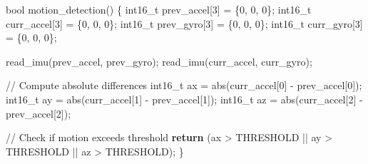 \documentclass[
  9pt,
  letterpaper,
  abstract,
  titlepage]{scrbook}
\newenvironment{Shaded}{\begin{snugshade}}{\end{snugshade}}
\newcommand{\CommentTok}[1]{\textcolor[rgb]{0.37,0.37,0.37}{#1}}
\newcommand{\ControlFlowTok}[1]{\textcolor[rgb]{0.00,0.23,0.31}{\textbf{#1}}}
\newcommand{\DataTypeTok}[1]{\textcolor[rgb]{0.68,0.00,0.00}{#1}}
\newcommand{\DecValTok}[1]{\textcolor[rgb]{0.68,0.00,0.00}{#1}}
\newcommand{\NormalTok}[1]{\textcolor[rgb]{0.00,0.23,0.31}{#1}}
\newcommand{\OperatorTok}[1]{\textcolor[rgb]{0.37,0.37,0.37}{#1}}
\begin{document}
\begin{Shaded}
\begin{Highlighting}[]
\DataTypeTok{bool}\NormalTok{ motion\_detection}\OperatorTok{()} \OperatorTok{\{}
  \DataTypeTok{int16\_t}\NormalTok{ prev\_accel}\OperatorTok{[}\DecValTok{3}\OperatorTok{]} \OperatorTok{=} \OperatorTok{\{}\DecValTok{0}\OperatorTok{,} \DecValTok{0}\OperatorTok{,} \DecValTok{0}\OperatorTok{\};}
  \DataTypeTok{int16\_t}\NormalTok{ curr\_accel}\OperatorTok{[}\DecValTok{3}\OperatorTok{]} \OperatorTok{=} \OperatorTok{\{}\DecValTok{0}\OperatorTok{,} \DecValTok{0}\OperatorTok{,} \DecValTok{0}\OperatorTok{\};}
  \DataTypeTok{int16\_t}\NormalTok{ prev\_gyro}\OperatorTok{[}\DecValTok{3}\OperatorTok{]} \OperatorTok{=} \OperatorTok{\{}\DecValTok{0}\OperatorTok{,} \DecValTok{0}\OperatorTok{,} \DecValTok{0}\OperatorTok{\};}
  \DataTypeTok{int16\_t}\NormalTok{ curr\_gyro}\OperatorTok{[}\DecValTok{3}\OperatorTok{]} \OperatorTok{=} \OperatorTok{\{}\DecValTok{0}\OperatorTok{,} \DecValTok{0}\OperatorTok{,} \DecValTok{0}\OperatorTok{\};}

\NormalTok{  read\_imu}\OperatorTok{(}\NormalTok{prev\_accel}\OperatorTok{,}\NormalTok{ prev\_gyro}\OperatorTok{);}
\NormalTok{  read\_imu}\OperatorTok{(}\NormalTok{curr\_accel}\OperatorTok{,}\NormalTok{ curr\_gyro}\OperatorTok{);}

  \CommentTok{// Compute absolute differences}
  \DataTypeTok{int16\_t}\NormalTok{ ax }\OperatorTok{=}\NormalTok{ abs}\OperatorTok{(}\NormalTok{curr\_accel}\OperatorTok{[}\DecValTok{0}\OperatorTok{]} \OperatorTok{{-}}\NormalTok{ prev\_accel}\OperatorTok{[}\DecValTok{0}\OperatorTok{]);}
  \DataTypeTok{int16\_t}\NormalTok{ ay }\OperatorTok{=}\NormalTok{ abs}\OperatorTok{(}\NormalTok{curr\_accel}\OperatorTok{[}\DecValTok{1}\OperatorTok{]} \OperatorTok{{-}}\NormalTok{ prev\_accel}\OperatorTok{[}\DecValTok{1}\OperatorTok{]);}
  \DataTypeTok{int16\_t}\NormalTok{ az }\OperatorTok{=}\NormalTok{ abs}\OperatorTok{(}\NormalTok{curr\_accel}\OperatorTok{[}\DecValTok{2}\OperatorTok{]} \OperatorTok{{-}}\NormalTok{ prev\_accel}\OperatorTok{[}\DecValTok{2}\OperatorTok{]);}

  \CommentTok{// Check if motion exceeds threshold}
  \ControlFlowTok{return} \OperatorTok{(}\NormalTok{ax }\OperatorTok{\textgreater{}}\NormalTok{ THRESHOLD }\OperatorTok{||}\NormalTok{ ay }\OperatorTok{\textgreater{}}\NormalTok{ THRESHOLD }\OperatorTok{||}\NormalTok{ az }\OperatorTok{\textgreater{}}\NormalTok{ THRESHOLD}\OperatorTok{);}
\OperatorTok{\}}
\end{Highlighting}
\end{Shaded}
\end{document}

